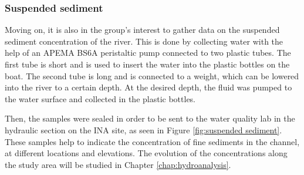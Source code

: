 \subsubsection{Suspended sediment}
Moving on, it is also in the group's interest to gather data on the suspended sediment concentration of the river. This is done by collecting water with the help of an APEMA BS6A peristaltic pump connected to two plastic tubes. The first tube is short and is used to insert the water into the plastic bottles on the boat. The second tube is long and is connected to a weight, which can be lowered into the river to a certain depth. At the desired depth, the fluid was pumped to the water surface and collected in the plastic bottles.

Then, the samples were sealed in order to be sent to the water quality lab in the hydraulic section on the INA site, as seen in Figure \ref{fig:suspended sediment}. These samples help to indicate the concentration of fine sediments in the channel, at different locations and elevations. The evolution of the concentrations along the study area will be studied in Chapter \ref{chap:hydroanalysis}.

